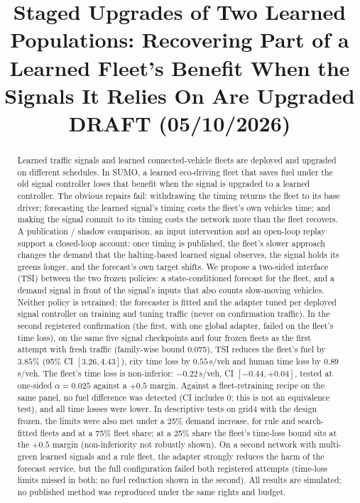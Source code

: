 \documentclass[11pt]{article}
\title{Staged Upgrades of Two Learned Populations: Recovering Part of a Learned Fleet's Benefit When the Signals It Relies On Are Upgraded\\[4pt]
\large DRAFT (05/10/2026)}
\date{}
\begin{document}
\maketitle

\begin{abstract}
Learned traffic signals and learned connected-vehicle fleets are deployed and upgraded on different schedules. In SUMO, a learned
eco-driving fleet that saves fuel under the old signal controller loses that benefit when the signal is upgraded to a learned controller.
The obvious repairs fail: withdrawing the timing returns the fleet to its base driver; forecasting the learned signal's timing costs the
fleet's own vehicles time; and making the signal commit to its timing costs the network more than the fleet recovers. A publication /
shadow comparison, an input intervention and an open-loop replay support a closed-loop account: once timing is published, the fleet's
slower approach changes the demand that the halting-based learned signal observes, the signal holds its greens longer, and
the forecast's own target shifts. We propose a two-sided interface (TSI) between the two frozen policies: a state-conditioned forecast for
the fleet, and a demand signal in front of the signal's inputs that also counts slow-moving vehicles. Neither policy is retrained; the
forecaster is fitted and the adapter tuned per deployed signal controller on training and tuning traffic (never on confirmation traffic). In the second registered confirmation
(the first, with one global adapter, failed on the fleet's time loss), on the same five signal checkpoints and four frozen fleets as the
first attempt with fresh traffic (family-wise bound 0.075),
TSI reduces the fleet's fuel by $3.85\%$ (95\% CI $[3.26, 4.43]$), city time loss by $0.55$\,s/veh and human time loss by $0.89$\,s/veh.
The fleet's time loss is non-inferior: $-0.22$\,s/veh, CI $[-0.44, +0.04]$, tested at one-sided $\alpha=0.025$ against a $+0.5$ margin.
Against a fleet-retraining recipe on the same panel, no fuel difference was detected (CI includes 0; this is not an equivalence test),
and all time losses were lower. In descriptive tests on grid4 with the design frozen, the limits were also met under a 25\% demand
increase, for rule and search-fitted fleets and at a 75\% fleet share; at a 25\% share the fleet's time-loss bound sits at the $+0.5$ margin
(non-inferiority not robustly shown). On a second network with multi-green learned signals and a rule fleet, the
adapter strongly reduces the harm of the forecast service, but the full configuration failed both registered attempts (time-loss limits
missed in both; no fuel reduction shown in the second). All results are simulated; no published method was reproduced under the same rights and budget.
\end{abstract}
\end{document}
